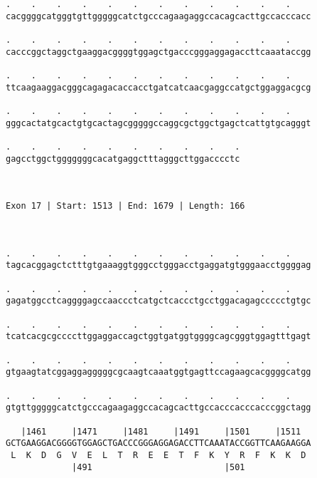 \documentclass{article}
\begin{document}
\begin{Verbatim}
.    .    .    .    .    .    .    .    .    .    .    .    
cacggggcatgggtgttgggggcatctgcccagaagaggccacagcacttgccacccacc
                                                            
.    .    .    .    .    .    .    .    .    .    .    .    
cacccggctaggctgaaggacggggtggagctgacccgggaggagaccttcaaataccgg
                                                            
.    .    .    .    .    .    .    .    .    .    .    .    
ttcaagaaggacgggcagagacaccacctgatcatcaacgaggccatgctggaggacgcg
                                                            
.    .    .    .    .    .    .    .    .    .    .    .    
gggcactatgcactgtgcactagcgggggccaggcgctggctgagctcattgtgcagggt
                                                            
.    .    .    .    .    .    .    .    .    .
gagcctggctgggggggcacatgaggctttagggcttggacccctc
                                              
                                              
 
Exon 17 | Start: 1513 | End: 1679 | Length: 166



.    .    .    .    .    .    .    .    .    .    .    .    
tagcacggagctctttgtgaaaggtgggcctgggacctgaggatgtgggaacctggggag
                                                            
.    .    .    .    .    .    .    .    .    .    .    .    
gagatggcctcaggggagccaaccctcatgctcaccctgcctggacagagccccctgtgc
                                                            
.    .    .    .    .    .    .    .    .    .    .    .    
tcatcacgcgccccttggaggaccagctggtgatggtggggcagcgggtggagtttgagt
                                                            
.    .    .    .    .    .    .    .    .    .    .    .    
gtgaagtatcggaggagggggcgcaagtcaaatggtgagttccagaagcacggggcatgg
                                                            
.    .    .    .    .    .    .    .    .    .    .    .    
gtgttgggggcatctgcccagaagaggccacagcacttgccacccacccacccggctagg
                                                            
   |1461     |1471     |1481     |1491     |1501     |1511  
GCTGAAGGACGGGGTGGAGCTGACCCGGGAGGAGACCTTCAAATACCGGTTCAAGAAGGA
 L  K  D  G  V  E  L  T  R  E  E  T  F  K  Y  R  F  K  K  D 
             |491                          |501             
  

\end{Verbatim}
\end{document}
